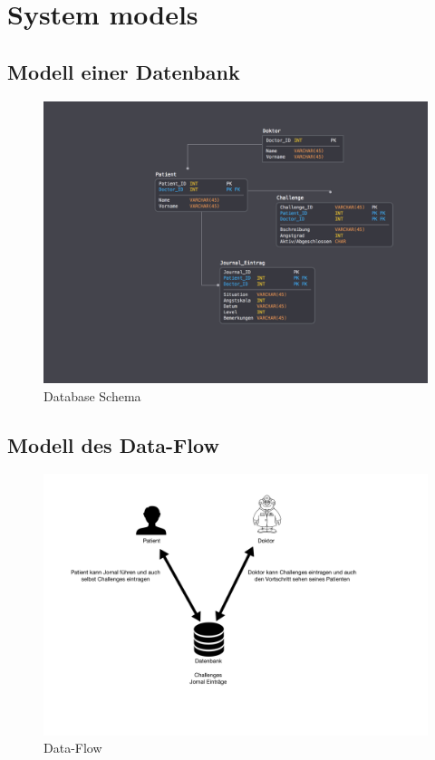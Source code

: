 \chapter{System models}

\section{Modell einer Datenbank}
\label{sec:dataschema}
\begin{figure}[H]
\includegraphics[width=1\textwidth]{System_models_Database_Task02.jpg}
\caption{Database Schema}
\end{figure}

\section{Modell des Data-Flow}
\begin{figure}[H]
\includegraphics[width=1\textwidth]{System_models_Semantic_task02.jpg}
\caption{Data-Flow}
\end{figure}
